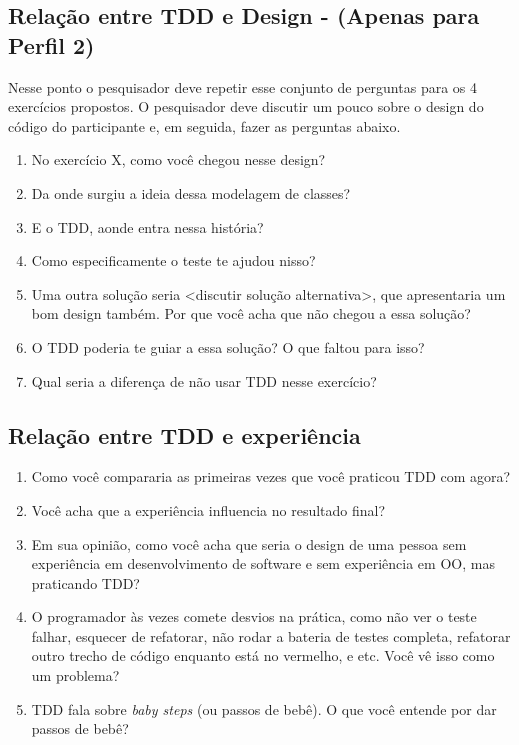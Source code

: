 \subsection{Relação entre TDD e Design - (Apenas para Perfil 2)}

Nesse ponto o pesquisador deve repetir esse conjunto de perguntas
para os 4 exercícios propostos.
O pesquisador deve discutir um pouco sobre o design do código do participante e, em seguida,
fazer as perguntas abaixo.

\begin{enumerate}
	
	\item No exercício X, como você chegou nesse design?
	
	\item Da onde surgiu a ideia dessa modelagem de classes?
	
	\item E o TDD, aonde entra nessa história?
	
	\item Como especificamente o teste te ajudou nisso?
	
	\item Uma outra solução seria <discutir solução alternativa>, que apresentaria um bom design também. Por que você
	acha que não chegou a essa solução?
	
	\item O TDD poderia te guiar a essa solução? O que faltou para isso?
	
	\item Qual seria a diferença de não usar TDD nesse exercício?

\end{enumerate}


\subsection{Relação entre TDD e experiência}
\label{entrevista:experiencia}

\begin{enumerate}
	\item Como você compararia as primeiras vezes que você praticou TDD com agora?

	\item Você acha que a experiência influencia no resultado final?

	\item Em sua opinião, como você acha que seria o design de uma pessoa sem
	experiência em desenvolvimento de software e sem experiência em OO, mas praticando TDD?

	\item O programador às vezes comete desvios na prática, como não ver o teste
	falhar,  esquecer de refatorar, não rodar a bateria de testes completa,
	refatorar outro trecho de código enquanto está no vermelho, e etc. Você vê isso
	como um problema?
	
	\item TDD fala sobre \textit{baby steps} (ou passos de bebê). O que você 
	entende por dar passos de bebê?

\end{enumerate}

